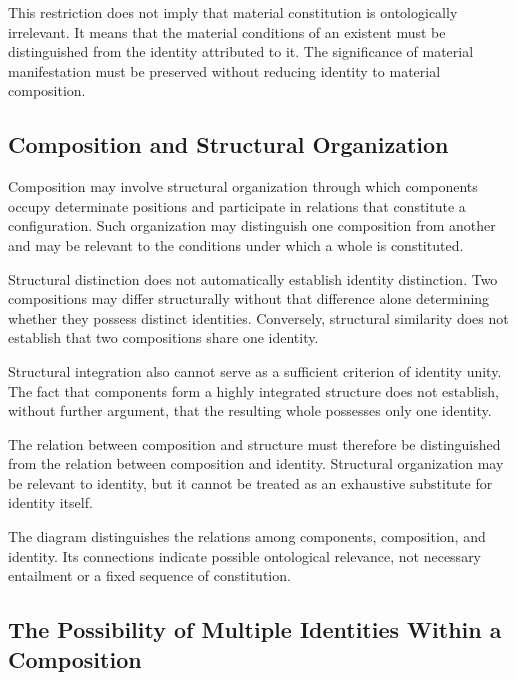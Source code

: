 This restriction does not imply that material constitution
is ontologically irrelevant. It means that the material
conditions of an existent must be distinguished from
the identity attributed to it. The significance of
material manifestation must be preserved without
reducing identity to material composition.

\subsection{Composition and Structural Organization}

Composition may involve structural organization through
which components occupy determinate positions and
participate in relations that constitute a configuration.
Such organization may distinguish one composition
from another and may be relevant to the conditions
under which a whole is constituted.

Structural distinction does not automatically establish
identity distinction. Two compositions may differ
structurally without that difference alone determining
whether they possess distinct identities. Conversely,
structural similarity does not establish that two
compositions share one identity.

Structural integration also cannot serve as a sufficient
criterion of identity unity. The fact that components
form a highly integrated structure does not establish,
without further argument, that the resulting whole
possesses only one identity.

The relation between composition and structure must
therefore be distinguished from the relation between
composition and identity. Structural organization
may be relevant to identity, but it cannot be treated
as an exhaustive substitute for identity itself.



The diagram distinguishes the relations among components,
composition, and identity. Its connections indicate
possible ontological relevance, not necessary entailment
or a fixed sequence of constitution.

\subsection{The Possibility of Multiple Identities Within a Composition}


